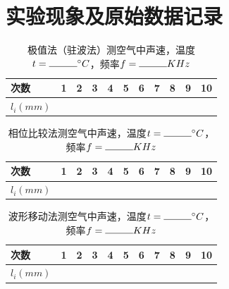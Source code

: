 \documentclass{ctexart}
\begin{document}
\newpage
\section{实验现象及原始数据记录}

\begin{table}[!h]
    \centering
    \caption{极值法（驻波法）测空气中声速，温度$t = \rule{1cm}{0.4pt} ^\circ C$，频率$f = \rule{1cm}{0.4pt} KHz$}
    \begin{tabular}{|m{1.5cm}<{\centering}|m{0.7cm}<{\centering}|m{0.7cm}<{\centering}|m{0.7cm}<{\centering}|m{0.7cm}<{\centering}|m{0.7cm}<{\centering}|m{0.7cm}<{\centering}|m{0.7cm}<{\centering}|m{0.7cm}<{\centering}|m{0.7cm}<{\centering}|m{0.7cm}<{\centering}|}
        \hline
        次数& 1 & 2 & 3 & 4 & 5 & 6 & 7 & 8 & 9 & 10 \\ 
        \hline
        $l_i(mm)$& & & & & & & & & & \\
        \hline
    \end{tabular}
\end{table}

\begin{table}[!h]
    \centering
    \caption{相位比较法测空气中声速，温度$t = \rule{1cm}{0.4pt} ^\circ C$，频率$f = \rule{1cm}{0.4pt} KHz$}
    \begin{tabular}{|m{1.5cm}<{\centering}|m{0.7cm}<{\centering}|m{0.7cm}<{\centering}|m{0.7cm}<{\centering}|m{0.7cm}<{\centering}|m{0.7cm}<{\centering}|m{0.7cm}<{\centering}|m{0.7cm}<{\centering}|m{0.7cm}<{\centering}|m{0.7cm}<{\centering}|m{0.7cm}<{\centering}|}
        \hline
        次数& 1 & 2 & 3 & 4 & 5 & 6 & 7 & 8 & 9 & 10 \\ 
        \hline
        $l_i(mm)$& & & & & & & & & & \\
        \hline
    \end{tabular}
\end{table}

\begin{table}[!h]
    \centering
    \caption{波形移动法测空气中声速，温度$t = \rule{1cm}{0.4pt} ^\circ C$，频率$f = \rule{1cm}{0.4pt} KHz$}
    \begin{tabular}{|m{1.5cm}<{\centering}|m{0.7cm}<{\centering}|m{0.7cm}<{\centering}|m{0.7cm}<{\centering}|m{0.7cm}<{\centering}|m{0.7cm}<{\centering}|m{0.7cm}<{\centering}|m{0.7cm}<{\centering}|m{0.7cm}<{\centering}|m{0.7cm}<{\centering}|m{0.7cm}<{\centering}|}
        \hline
        次数& 1 & 2 & 3 & 4 & 5 & 6 & 7 & 8 & 9 & 10 \\ 
        \hline
        $l_i(mm)$& & & & & & & & & & \\
        \hline
    \end{tabular}
\end{table}
\end{document}
